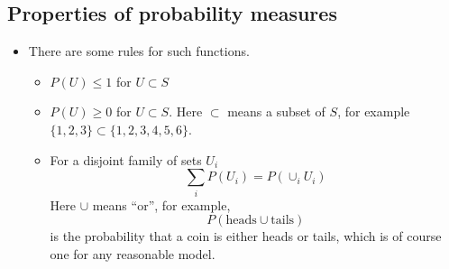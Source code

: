 \subsection{Properties of probability measures \cite[Ch 1. Sec. 1.2]{tabak}}
\begin{itemize}
\item There are some rules for such functions. 
\begin{itemize}
\item $P(U) \le 1$  for $U \subset S$
\item $P(U) \ge 0$ for $U \subset S$. Here $\subset$ means a subset of $S$, for example $\{1,2,3\} \subset \{1,2,3,4,5,6\}$. 
\item For a disjoint family of sets $U_i$
\begin{equation*}
 \sum_{i}P(U_i) = P\left(\cup_i U_i\right)
\end{equation*}
Here $\cup$ means ``or'', for example, 
\begin{equation*}
 P\left(\text{heads} \cup \text{tails} \right) 
 \end{equation*}
 is the probability that a coin is either heads or tails, which is of course one for any reasonable model. 
\end{itemize}




\end{itemize}
